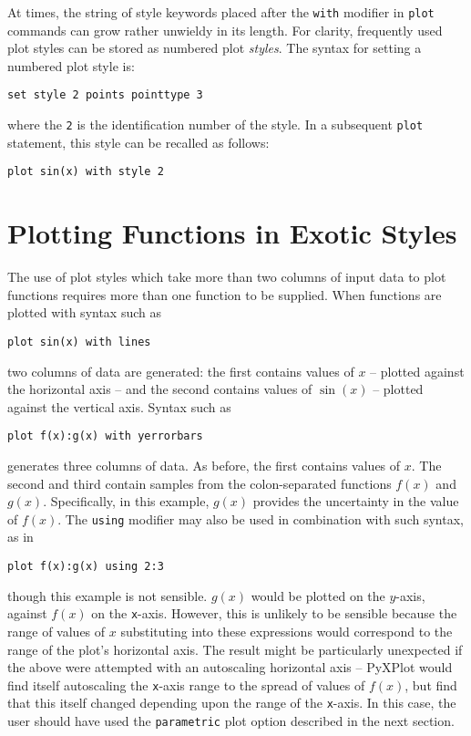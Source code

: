At times, the string of style keywords placed after the {\tt with} modifier in
{\tt plot} commands can grow rather unwieldy in its length. For clarity,
frequently used plot styles can be stored as numbered plot {\it styles}.  The
syntax for setting a numbered plot style is:

\begin{verbatim}
set style 2 points pointtype 3
\end{verbatim}

\noindent where the {\tt 2} is the identification number of the style. In a
subsequent {\tt plot} statement, this style can be recalled as follows:

\begin{verbatim}
plot sin(x) with style 2
\end{verbatim}

\section{Plotting Functions in Exotic Styles}

The use of plot styles which take more than two columns of input data to plot
functions requires more than one function to be supplied.  When functions are
plotted with syntax such as

\begin{verbatim}
plot sin(x) with lines
\end{verbatim}

\noindent two columns of data are generated: the first contains values of $x$
-- plotted against the horizontal axis -- and the second contains values of
$\sin(x)$ -- plotted against the vertical axis. Syntax such as

\begin{verbatim}
plot f(x):g(x) with yerrorbars
\end{verbatim}

\noindent generates three columns of data. As before, the first contains values
of $x$. The second and third contain samples from the colon-separated functions
$f(x)$ and $g(x)$. Specifically, in this example, $g(x)$ provides the
uncertainty in the value of $f(x)$.  The {\tt using} modifier may also be used
in combination with such syntax, as in

\begin{verbatim}
plot f(x):g(x) using 2:3
\end{verbatim}

\noindent though this example is not sensible. $g(x)$ would be plotted on the
$y$-axis, against $f(x)$ on the {\tt x}-axis. However, this is unlikely to be
sensible because the range of values of $x$ substituting into these expressions
would correspond to the range of the plot's horizontal axis. The result might
be particularly unexpected if the above were attempted with an autoscaling
horizontal axis -- PyXPlot would find itself autoscaling the {\tt x}-axis range
to the spread of values of $f(x)$, but find that this itself changed depending
upon the range of the {\tt x}-axis. In this case, the user should have used the
{\tt parametric} plot option described in the next section.

